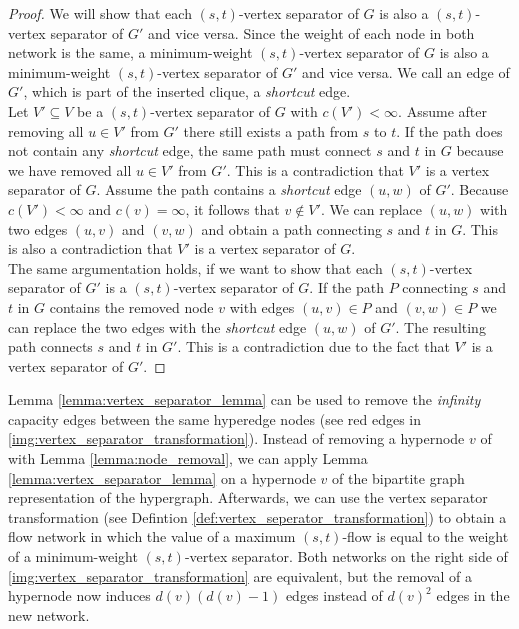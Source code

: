 \begin{proof}
We will show that each $(s,t)$-vertex separator of $G$ is also a $(s,t)$-vertex separator
of $G'$ and vice versa. Since the weight of each node in both network is the same, a minimum-weight
$(s,t)$-vertex separator of $G$ is also a minimum-weight $(s,t)$-vertex separator of $G'$ and vice versa.
We call an edge of $G'$, which is part of the inserted clique, a \emph{shortcut} edge.\\
Let $V' \subseteq V$ be a $(s,t)$-vertex separator of $G$ with $c(V') < \infty$. Assume after removing
all $u \in V'$ from $G'$ there still exists a path from $s$ to $t$. If the path does not contain any
\emph{shortcut} edge, the same path must connect $s$ and $t$ in $G$ because we have removed all $u \in V'$
from $G'$. This is a contradiction that $V'$ is a vertex separator of $G$. Assume the path contains
a \emph{shortcut} edge $(u,w)$ of $G'$.  Because $c(V') < \infty$ and $c(v) = \infty$,
it follows that $v \notin V'$. We can replace $(u,w)$ with two edges $(u,v)$ and $(v,w)$
and obtain a path connecting $s$ and $t$ in $G$. This is also a contradiction that $V'$ is a vertex
separator of $G$.\\
The same argumentation holds, if we want to show that each $(s,t)$-vertex separator of $G'$
is a $(s,t)$-vertex separator of $G$. If the path $P$ connecting $s$ and $t$ in $G$ contains
the removed node $v$ with edges $(u,v) \in P$ and $(v,w) \in P$ we can replace the two edges
with the \emph{shortcut} edge $(u,w)$ of $G'$. The resulting path connects $s$ and $t$ in $G'$.
This is a contradiction due to the fact that $V'$ is a vertex separator of $G'$.
\end{proof}

Lemma \ref{lemma:vertex_separator_lemma} can be used to remove the \emph{infinity} capacity
edges between the same hyperedge nodes (see red edges in \autoref{img:vertex_separator_transformation}).
Instead of removing a hypernode $v$ of  with Lemma \ref{lemma:node_removal}, we can apply
Lemma \ref{lemma:vertex_separator_lemma} on a hypernode $v$ of the bipartite graph representation
of the hypergraph. Afterwards, we can use the vertex separator transformation (see Defintion \ref{def:vertex_seperator_transformation})
to obtain a flow network in which the value of a maximum $(s,t)$-flow is equal to the
weight of a minimum-weight $(s,t)$-vertex separator. Both networks on the right side of 
\autoref{img:vertex_separator_transformation} are equivalent, but the removal of a hypernode
now induces $d(v)(d(v) - 1)$ edges instead of $d(v)^2$ edges in the new network.

